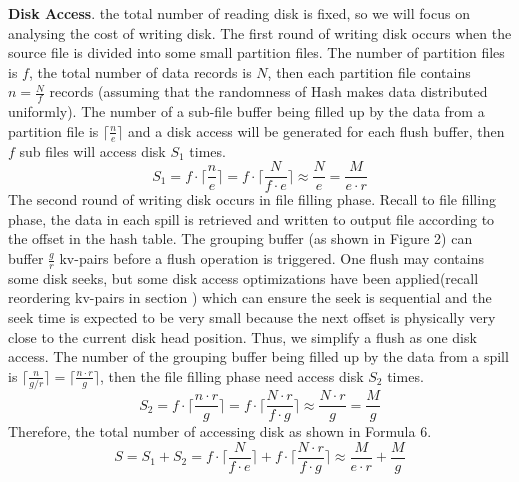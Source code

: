 \textbf{Disk Access}. the total number of reading disk is fixed, so we will focus on analysing the cost of writing disk. The first round of writing disk occurs when the source file is divided into some small partition files. The number of partition files is $f$, the total number of data records is $N$, then each partition file contains  $n=\frac{N}{f}$ records (assuming that the randomness of Hash makes data distributed uniformly). The number of a sub-file buffer being filled up by the data from a partition file is $\lceil\frac{n}{e}\rceil$ and a disk access will be generated for each flush buffer, then $f$ sub files will access disk $S_1$ times.
\begin{equation}\label{eq:numberofdata}
  S_1=f\cdot \lceil\frac{n}{e}\rceil=f\cdot\lceil\frac{N}{f\cdot e}\rceil \approx \frac{N}{e}=\frac{M}{e\cdot r}
\end{equation}
The second round of writing disk occurs in file filling phase. Recall to file filling phase, the data in each spill is retrieved and written to output file according to the offset in the hash table. The grouping buffer (as shown in Figure 2) can buffer $\frac{g}{r}$ kv-pairs before a flush operation is triggered. One flush may contains some disk seeks, but some disk access optimizations have been applied(recall reordering kv-pairs in section \uppercase\expandafter{}) which can ensure the seek is sequential and the seek time is expected to be very small because the next offset is physically very close to the current disk head position. Thus, we simplify a flush as one disk access. The number of the grouping buffer being filled up by the data from a spill is $\lceil\frac{n}{g/r}\rceil=\lceil\frac{n\cdot r}{g}\rceil$, then the file filling phase need access disk $S_2$ times.
\begin{equation}\label{eq:numberofdata}
  S_2=f\cdot \lceil\frac{n\cdot r}{g}\rceil=f\cdot\lceil\frac{N\cdot r}{f\cdot g}\rceil \approx \frac{N\cdot r}{g}=\frac{M}{g}
\end{equation}
Therefore, the total number of accessing disk as shown in Formula 6.
\begin{equation}\label{eq:numberofdata}
  S=S_1+S_2=f\cdot\lceil\frac{N}{f\cdot e}\rceil + f\cdot\lceil\frac{N\cdot r}{f\cdot g}\rceil \approx \frac{M}{e\cdot r}+\frac{M}{g}
\end{equation}

